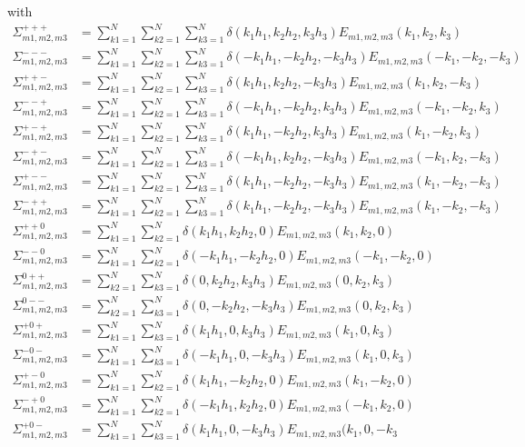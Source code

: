 with
\begin{align*}
\Sigma_{m1,m2,m3}^{+++}&=\sum_{k1=1}^{N}\sum_{k2=1}^{N}\sum_{k3=1}^{N}\delta(k_1h_1,k_2h_2,k_3h_3) E_{m1,m2,m3}(k_1,k_2,k_3)\\
\Sigma_{m1,m2,m3}^{---}&=\sum_{k1=1}^{N}\sum_{k2=1}^{N}\sum_{k3=1}^{N}\delta(-k_1h_1,-k_2h_2,-k_3h_3) E_{m1,m2,m3}(-k_1,-k_2,-k_3)\\
\Sigma_{m1,m2,m3}^{++-}&=\sum_{k1=1}^{N}\sum_{k2=1}^{N}\sum_{k3=1}^{N}\delta(k_1h_1,k_2h_2,-k_3h_3) E_{m1,m2,m3}(k_1,k_2,-k_3)\\
\Sigma_{m1,m2,m3}^{--+}&=\sum_{k1=1}^{N}\sum_{k2=1}^{N}\sum_{k3=1}^{N}\delta(-k_1h_1,-k_2h_2,k_3h_3) E_{m1,m2,m3}(-k_1,-k_2,k_3)\\
\Sigma_{m1,m2,m3}^{+-+}&=\sum_{k1=1}^{N}\sum_{k2=1}^{N}\sum_{k3=1}^{N}\delta(k_1h_1,-k_2h_2,k_3h_3) E_{m1,m2,m3}(k_1,-k_2,k_3)\\
\Sigma_{m1,m2,m3}^{-+-}&=\sum_{k1=1}^{N}\sum_{k2=1}^{N}\sum_{k3=1}^{N}\delta(-k_1h_1,k_2h_2,-k_3h_3) E_{m1,m2,m3}(-k_1,k_2,-k_3)\\
\Sigma_{m1,m2,m3}^{+--}&=\sum_{k1=1}^{N}\sum_{k2=1}^{N}\sum_{k3=1}^{N}\delta(k_1h_1,-k_2h_2,-k_3h_3) E_{m1,m2,m3}(k_1,-k_2,-k_3)\\
\Sigma_{m1,m2,m3}^{-++}&=\sum_{k1=1}^{N}\sum_{k2=1}^{N}\sum_{k3=1}^{N}\delta(k_1h_1,-k_2h_2,-k_3h_3) E_{m1,m2,m3}(k_1,-k_2,-k_3)\\
\Sigma_{m1,m2,m3}^{++0}&=\sum_{k1=1}^{N}\sum_{k2=1}^{N}\delta(k_1h_1,k_2h_2,0) E_{m1,m2,m3}(k_1,k_2,0)\\
\Sigma_{m1,m2,m3}^{--0}&=\sum_{k1=1}^{N}\sum_{k2=1}^{N}\delta(-k_1h_1,-k_2h_2,0) E_{m1,m2,m3}(-k_1,-k_2,0)\\
\Sigma_{m1,m2,m3}^{0++}&=\sum_{k2=1}^{N}\sum_{k3=1}^{N}\delta(0,k_2h_2,k_3h_3) E_{m1,m2,m3}(0,k_2,k_3)\\
\Sigma_{m1,m2,m3}^{0--}&=\sum_{k2=1}^{N}\sum_{k3=1}^{N}\delta(0,-k_2h_2,-k_3h_3) E_{m1,m2,m3}(0,k_2,k_3)\\
\Sigma_{m1,m2,m3}^{+0+}&=\sum_{k1=1}^{N}\sum_{k3=1}^{N}\delta(k_1h_1,0,k_3h_3) E_{m1,m2,m3}(k_1,0,k_3)\\
\Sigma_{m1,m2,m3}^{-0-}&=\sum_{k1=1}^{N}\sum_{k3=1}^{N}\delta(-k_1h_1,0,-k_3h_3) E_{m1,m2,m3}(k_1,0,k_3)\\
\Sigma_{m1,m2,m3}^{+-0}&=\sum_{k1=1}^{N}\sum_{k2=1}^{N}\delta(k_1h_1,-k_2h_2, 0) E_{m1,m2,m3}(k_1,-k_2,0)\\
\Sigma_{m1,m2,m3}^{-+0}&=\sum_{k1=1}^{N}\sum_{k2=1}^{N}\delta(-k_1h_1,k_2h_2, 0) E_{m1,m2,m3}(-k_1,k_2,0)\\
\Sigma_{m1,m2,m3}^{+0-}&=\sum_{k1=1}^{N}\sum_{k3=1}^{N}\delta(k_1h_1,0,-k_3h_3) E_{m1,m2,m3}(k_1,0,-k_3\\

\end{align*}
